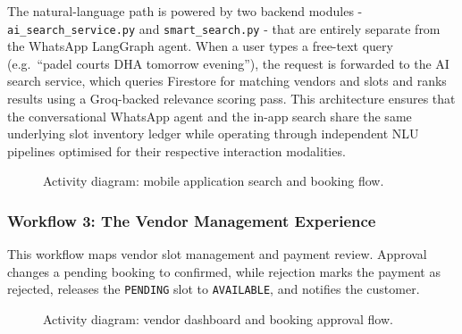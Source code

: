 The natural-language path is powered by two backend modules - \texttt{ai\_search\_service.py} and \texttt{smart\_search.py} - that are entirely separate from the WhatsApp LangGraph agent. When a user types a free-text query (e.g.\ ``padel courts DHA tomorrow evening''), the request is forwarded to the AI search service, which queries Firestore for matching vendors and slots and ranks results using a Groq-backed relevance scoring pass. This architecture ensures that the conversational WhatsApp agent and the in-app search share the same underlying slot inventory ledger while operating through independent NLU pipelines optimised for their respective interaction modalities.
\begin{figure}[H]
    \centering
    \caption{Activity diagram: mobile application search and booking flow.}
    \label{fig:sds-app-flow}
\end{figure}

\FloatBarrier
\subsubsection{Workflow 3: The Vendor Management Experience}
This workflow maps vendor slot management and payment review. Approval changes a pending booking to confirmed, while rejection marks the payment as rejected, releases the \texttt{PENDING} slot to \texttt{AVAILABLE}, and notifies the customer.
\begin{figure}[H]
    \centering
    \caption{Activity diagram: vendor dashboard and booking approval flow.}
    \label{fig:sds-vend-flow}
\end{figure}

\endgroup

